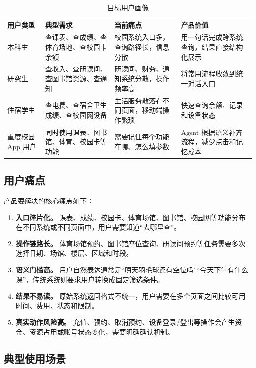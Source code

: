 \documentclass[UTF8,a4paper,zihao=-4,fontset=none]{ctexart}
\begin{document}
\begin{table}[H]
\centering
\caption{目标用户画像}
\label{tab:user}
\small
\begin{tabularx}{\textwidth}{p{2.2cm}X X X}
\toprule
用户类型 & 典型需求 & 当前痛点 & 产品价值 \\
\midrule
本科生 & 查课表、查成绩、查体育场地、查校园卡余额 & 校园系统入口多，查询路径长，信息分散 & 用一句话完成跨系统查询，结果直接结构化展示 \\
研究生 & 查收入、查研读间、查图书馆资源、查通知 & 研读间、财务、通知系统分散，操作频率高 & 将常用流程收敛到统一对话入口 \\
住宿学生 & 查电费、查宿舍卫生成绩、查校园网设备 & 生活服务散落在不同页面，移动端操作繁琐 & 快速查询余额、记录和设备状态 \\
重度校园 App 用户 & 同时使用课表、图书馆、体育、校园卡等功能 & 需要记住每个功能在哪、怎么填参数 & Agent 根据语义补齐流程，减少点击和记忆成本 \\
\bottomrule
\end{tabularx}
\end{table}

\subsection{用户痛点}

产品要解决的核心痛点如下：

\begin{enumerate}
  \item \textbf{入口碎片化。} 课表、成绩、校园卡、体育场馆、图书馆、校园网等功能分布在不同系统或不同页面中，用户需要知道“去哪里查”。
  \item \textbf{操作链路长。} 体育场馆预约、图书馆座位查询、研读间预约等任务需要多次选择日期、场馆、楼层、区域和时段。
  \item \textbf{语义门槛高。} 用户自然表达通常是“明天羽毛球还有空位吗”“今天下午有什么课”，传统系统则要求用户转换成固定筛选条件。
  \item \textbf{结果不易读。} 原始系统返回格式不统一，用户需要在多个页面之间比较可用时间、费用、状态和限制。
  \item \textbf{真实动作风险高。} 充值、预约、取消预约、设备登录/登出等操作会产生资金、资源占用或账号状态变化，需要明确确认机制。
\end{enumerate}

\subsection{典型使用场景}
\end{document}
